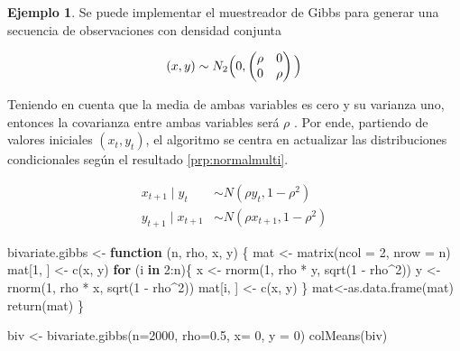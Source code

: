 \documentclass[
  10pt,
  spanish,
]{book}
\newenvironment{Shaded}{\begin{snugshade}}{\end{snugshade}}
\newcommand{\AttributeTok}[1]{\textcolor[rgb]{0.77,0.63,0.00}{#1}}
\newcommand{\ControlFlowTok}[1]{\textcolor[rgb]{0.13,0.29,0.53}{\textbf{#1}}}
\newcommand{\DecValTok}[1]{\textcolor[rgb]{0.00,0.00,0.81}{#1}}
\newcommand{\FloatTok}[1]{\textcolor[rgb]{0.00,0.00,0.81}{#1}}
\newcommand{\FunctionTok}[1]{\textcolor[rgb]{0.00,0.00,0.00}{#1}}
\newcommand{\NormalTok}[1]{#1}
\newcommand{\OtherTok}[1]{\textcolor[rgb]{0.56,0.35,0.01}{#1}}
\newcommand{\SpecialCharTok}[1]{\textcolor[rgb]{0.00,0.00,0.00}{#1}}
\theoremstyle{definition}
\theoremstyle{definition}
\newtheorem{example}{Ejemplo}[chapter]
\theoremstyle{definition}
\theoremstyle{definition}
\theoremstyle{remark}
\begin{document}
\begin{example}
\protect\hypertarget{exm:unnamed-chunk-14}{}{\label{exm:unnamed-chunk-14} }Se puede implementar el muestreador de Gibbs para generar una secuencia de observaciones con densidad
conjunta

\begin{equation*}
(x,y) \sim N_2 \Bigl(0,
 \begin{pmatrix}
 \rho & 0 \\
 0 & \rho
 \end{pmatrix}
 \Bigl)
\end{equation*}

Teniendo en cuenta que la media de ambas variables es cero y su
varianza uno, entonces la covarianza entre ambas variables será \(\rho\) \citep{Robert}. Por ende, partiendo de valores iniciales \((x_t, y_t)\), el algoritmo se centra en actualizar las distribuciones condicionales según el resultado \ref{prp:normalmulti}.

\begin{align*}
x_{t+1}\mid y_t     & \sim N(\rho y_t, 1-\rho^2)\\
y_{t+1}\mid x_{t+1} & \sim N(\rho x_{t+1}, 1-\rho^2)
\end{align*}
\end{example}

\begin{Shaded}
\begin{Highlighting}[]
\NormalTok{bivariate.gibbs }\OtherTok{\textless{}{-}} \ControlFlowTok{function}\NormalTok{ (n, rho, x, y) \{}
\NormalTok{  mat }\OtherTok{\textless{}{-}} \FunctionTok{matrix}\NormalTok{(}\AttributeTok{ncol =} \DecValTok{2}\NormalTok{, }\AttributeTok{nrow =}\NormalTok{ n)}
\NormalTok{  mat[}\DecValTok{1}\NormalTok{, ] }\OtherTok{\textless{}{-}} \FunctionTok{c}\NormalTok{(x, y)}
  \ControlFlowTok{for}\NormalTok{ (i }\ControlFlowTok{in} \DecValTok{2}\SpecialCharTok{:}\NormalTok{n)\{}
\NormalTok{    x }\OtherTok{\textless{}{-}} \FunctionTok{rnorm}\NormalTok{(}\DecValTok{1}\NormalTok{, rho }\SpecialCharTok{*}\NormalTok{ y, }\FunctionTok{sqrt}\NormalTok{(}\DecValTok{1} \SpecialCharTok{{-}}\NormalTok{ rho}\SpecialCharTok{\^{}}\DecValTok{2}\NormalTok{))}
\NormalTok{    y }\OtherTok{\textless{}{-}} \FunctionTok{rnorm}\NormalTok{(}\DecValTok{1}\NormalTok{, rho }\SpecialCharTok{*}\NormalTok{ x, }\FunctionTok{sqrt}\NormalTok{(}\DecValTok{1} \SpecialCharTok{{-}}\NormalTok{ rho}\SpecialCharTok{\^{}}\DecValTok{2}\NormalTok{))}
\NormalTok{    mat[i, ] }\OtherTok{\textless{}{-}} \FunctionTok{c}\NormalTok{(x, y)}
\NormalTok{  \}}
\NormalTok{  mat}\OtherTok{\textless{}{-}}\FunctionTok{as.data.frame}\NormalTok{(mat)}
  \FunctionTok{return}\NormalTok{(mat)}
\NormalTok{\}}

\NormalTok{biv }\OtherTok{\textless{}{-}} \FunctionTok{bivariate.gibbs}\NormalTok{(}\AttributeTok{n=}\DecValTok{2000}\NormalTok{, }\AttributeTok{rho=}\FloatTok{0.5}\NormalTok{, }\AttributeTok{x=} \DecValTok{0}\NormalTok{, }\AttributeTok{y =} \DecValTok{0}\NormalTok{)}
\FunctionTok{colMeans}\NormalTok{(biv)}
\end{Highlighting}
\end{Shaded}
\end{document}
